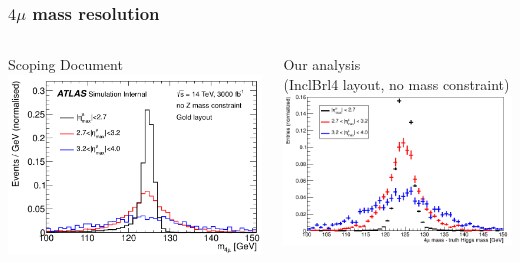\documentclass{beamer}
\begin{document}
\begin{frame}[t]
\frametitle{$4\mu$ mass resolution}

\begin{columns}
\begin{column}{.5\textwidth}
\centering
\vskip1.2cm
Scoping Document
\includegraphics[width=\textwidth]{scopingRecoMass}
\end{column}
\begin{column}{.5\textwidth}
\centering
\vskip0.8cm
Our analysis \\(InclBrl4 layout, no mass constraint)
\includegraphics[width=\textwidth]{HZZ4mu/recoMass}
\end{column}

\end{columns}
\end{frame}

\end{document}

